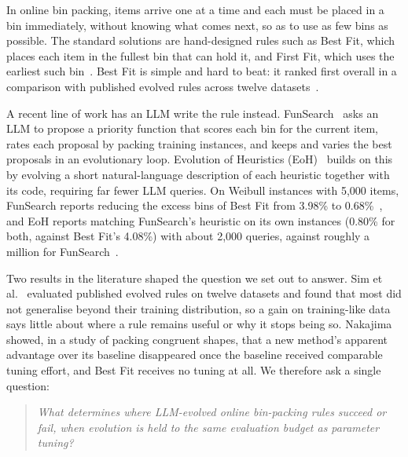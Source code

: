 \documentclass[10pt,twocolumn]{article}
\makeatletter
\renewcommand\section{\@startsection{section}{1}{\z@}{2.6ex \@plus .6ex \@minus .2ex}{1.4ex \@plus .2ex}{\normalfont\Large\bfseries}}
\makeatother
\begin{document}
\section{Introduction}

In online bin packing, items arrive one at a time and each must be placed in a bin immediately, without knowing what comes next, so as to use as few bins as possible. The standard solutions are hand-designed rules such as Best Fit, which places each item in the fullest bin that can hold it, and First Fit, which uses the earliest such bin~\citep{sgall2014online}. Best Fit is simple and hard to beat: it ranked first overall in a comparison with published evolved rules across twelve datasets~\citep{sim2025beyond}.

A recent line of work has an LLM write the rule instead. FunSearch~\citep{romera2024funsearch} asks an LLM to propose a priority function that scores each bin for the current item, rates each proposal by packing training instances, and keeps and varies the best proposals in an evolutionary loop. Evolution of Heuristics (EoH)~\citep{liu2024eoh} builds on this by evolving a short natural-language description of each heuristic together with its code, requiring far fewer LLM queries. On Weibull instances with 5,000 items, FunSearch reports reducing the excess bins of Best Fit from 3.98\% to 0.68\%~\citep{romera2024funsearch}, and EoH reports matching FunSearch's heuristic on its own instances (0.80\% for both, against Best Fit's 4.08\%) with about 2,000 queries, against roughly a million for FunSearch~\citep{liu2024eoh}.

Two results in the literature shaped the question we set out to answer. Sim et al.~\cite{sim2025beyond} evaluated published evolved rules on twelve datasets and found that most did not generalise beyond their training distribution, so a gain on training-like data says little about where a rule remains useful or why it stops being so. Nakajima~\cite{nakajima2026soft} showed, in a study of packing congruent shapes, that a new method's apparent advantage over its baseline disappeared once the baseline received comparable tuning effort, and Best Fit receives no tuning at all. We therefore ask a single question:

\begin{quote}
\emph{What determines where LLM-evolved online bin-packing rules succeed or fail, when evolution is held to the same evaluation budget as parameter tuning?}
\end{quote}
\end{document}
